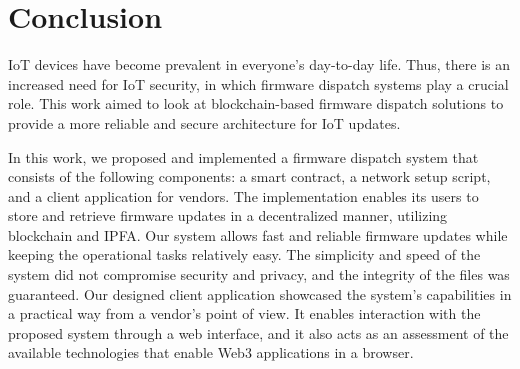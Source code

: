 \documentclass[conference]{IEEEtran}
\begin{document}
\section{Conclusion} \label{sec:6}
IoT devices have become prevalent in everyone's day-to-day life. Thus, there is an increased need for IoT security, in which firmware dispatch systems play a crucial role. This work aimed to look at blockchain-based firmware dispatch solutions to provide a more reliable and secure architecture for IoT updates.

In this work, we proposed and implemented a firmware dispatch system that consists of the following components: a smart contract, a network setup script, and a client application for vendors. The implementation enables its users to store and retrieve firmware updates in a decentralized manner, utilizing blockchain and IPFA. Our system allows fast and reliable firmware updates while keeping the operational tasks relatively easy. The simplicity and speed of the system did not compromise security and privacy, and the integrity of the files was guaranteed. Our designed client application showcased the system's capabilities in a practical way from a vendor's point of view. It enables interaction with the proposed system through a web interface, and it also acts as an assessment of the available technologies that enable Web3 applications in a browser.









%
%
\end{document}
